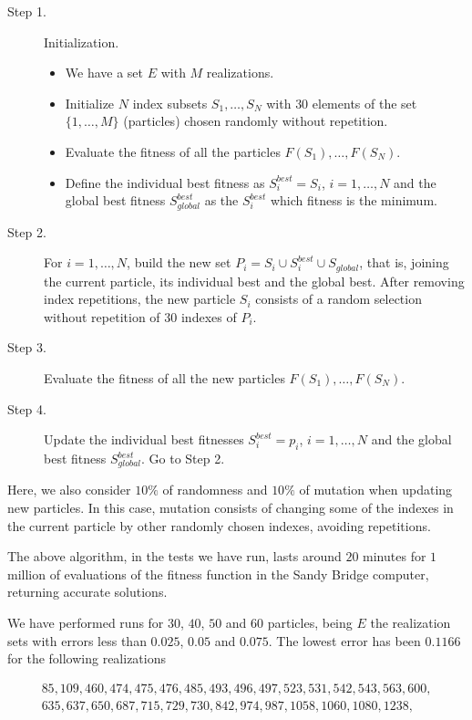 \begin{description}
	\item[Step 1.] Initialization.
	\begin{itemize}
		\item We have a set $E$ with $M$ realizations.
		\item Initialize $N$ index subsets $S_1,\ldots,S_N$ with $30$ elements of the set $\{1,\ldots,M\}$ (particles) chosen randomly without repetition.
		\item Evaluate the fitness of all the particles $F(S_1), \ldots, F(S_N)$.
		\item Define the individual best fitness as $S_i^{best} = S_i$, $i=1,\ldots,N$ and the global best fitness $S_{global}^{best}$ as the $S_i^{best}$ which fitness is the minimum.
	\end{itemize}
	\item[Step 2.] For $i=1,\ldots,N$, build the new set $P_i=S_i \cup S_i^{best} \cup S_{global}$, that is, joining the current particle, its individual best and the global best. After removing index repetitions, the new particle $S_i$ consists of a random selection without repetition of $30$ indexes of $P_i$.
	\item[Step 3.] Evaluate the fitness of all the new particles $F(S_1), \ldots, F(S_N)$.	
	\item[Step 4.] Update the individual best fitnesses $S_i^{best} = p_i$, $i=1,\ldots,N$ and  the global best fitness $S_{global}^{best}$. Go to Step 2. 
\end{description}

Here, we also consider $10\%$ of randomness and $10\%$ of mutation when updating new particles. In this case, mutation consists of changing some of the indexes in the current particle by other randomly chosen indexes, avoiding repetitions.

The above algorithm, in the tests we have run, lasts around $20$ minutes for $1$ million of evaluations of the fitness function in the Sandy Bridge computer, returning accurate solutions.

We have performed runs for $30$, $40$, $50$ and $60$ particles, being $E$ the realization sets with errors less than $0.025$, $0.05$ and $0.075$. The lowest error has been $0.1166$ for the following realizations  

\begin{equation}
\begin{array}{c}
85, 109, 460, 474, 475, 476, 485, 493, 496, 497, 523, 531, 542, 543, 563, 600, \\
635, 637, 650, 687, 715, 729, 730, 842, 974, 987, 1058, 1060, 1080, 1238,	
\end{array}
\label{laselegidas}    
\end{equation}

